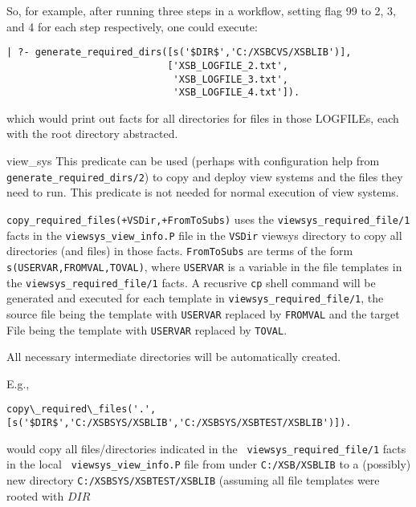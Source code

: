 \begin{description}
So, for example, after running three steps in a workflow, setting flag
99 to 2, 3, and 4 for each step respectively, one could execute:
\begin{verbatim}	   
| ?- generate_required_dirs([s('$DIR$','C:/XSBCVS/XSBLIB')],
                            ['XSB_LOGFILE_2.txt',
                             'XSB_LOGFILE_3.txt',
                             'XSB_LOGFILE_4.txt']).
\end{verbatim}	   

\noindent which would print out facts for all directories for files in
those LOGFILEs, each with the root directory abstracted.

{view\_sys}
%
This predicate can be used (perhaps with configuration help from {\tt
  generate\_required\_dirs/2}) to copy and deploy view systems and the
files they need to run.  This predicate is not needed for normal
execution of view systems.

{\tt copy\_required\_files(+VSDir,+FromToSubs)} uses the
{\tt viewsys\_required\_file/1} facts in the {\tt viewsys\_view\_info.P}
file in the {\tt VSDir} viewsys directory to copy all directories (and
files) in those facts.  {\tt FromToSubs} are terms of the form
{\tt s(USERVAR,FROMVAL,TOVAL)}, where {\tt USERVAR} is a variable in the
file templates in the {\tt viewsys\_required\_file/1} facts.  A
recusrive {\tt cp} shell command will be generated and executed for
each template in {\tt viewsys\_required\_file/1}, the source file being
the template with {\tt USERVAR} replaced by {\tt FROMVAL} and the target
File being the template with {\tt USERVAR} replaced by {\tt TOVAL}.

All necessary intermediate directories will be automatically created.

E.g.,
\begin{verbatim}
copy\_required\_files('.',[s('$DIR$','C:/XSBSYS/XSBLIB','C:/XSBSYS/XSBTEST/XSBLIB')]).
\end{verbatim}

\noindent would copy all files/directories indicated in the {\tt
  viewsys\_required\_file/1} facts in the local {\tt
  viewsys\_view\_info.P} file from under {\tt C:/XSB/XSBLIB} to a
(possibly) new directory {\tt C:/XSBSYS/XSBTEST/XSBLIB} (assuming all
file templates were rooted with {\tt $DIR$}


\end{description}

